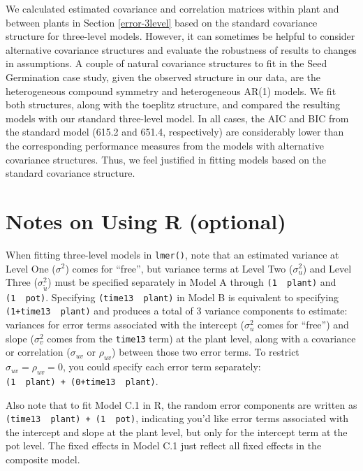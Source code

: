 \documentclass[
]{krantz}
\begin{document}
We calculated estimated covariance and correlation matrices within plant and between plants in Section \ref{error-3level} based on the standard covariance structure for three-level models. However, it can sometimes be helpful to consider alternative covariance structures and evaluate the robustness of results to changes in assumptions. A couple of natural covariance structures to fit in the Seed Germination case study, given the observed structure in our data, are the heterogeneous compound symmetry and heterogeneous AR(1) models. We fit both structures, along with the toeplitz structure, and compared the resulting models with our standard three-level model. In all cases, the AIC and BIC from the standard model (615.2 and 651.4, respectively) are considerably lower than the corresponding performance measures from the models with alternative covariance structures. Thus, we feel justified in fitting models based on the standard covariance structure.

\hypertarget{usingR3}{%
\section{Notes on Using R (optional)}\label{usingR3}}

When fitting three-level models in \texttt{lmer()}, note that an estimated variance at Level One (\(\sigma^{2}\)) comes for ``free'', but variance terms at Level Two (\(\sigma_{u}^{2}\)) and Level Three (\(\sigma_{\tilde{u}}^{2}\)) must be specified separately in Model A through \texttt{(1\ \textbar{}\ plant)} and \texttt{(1\ \textbar{}\ pot)}. Specifying \texttt{(time13\ \textbar{}\ plant)} in Model B is equivalent to specifying \texttt{(1+time13\ \textbar{}\ plant)} and produces a total of 3 variance components to estimate: variances for error terms associated with the intercept (\(\sigma_{u}^{2}\) comes for ``free'') and slope (\(\sigma_{v}^{2}\) comes from the \texttt{time13} term) at the plant level, along with a covariance or correlation (\(\sigma_{uv}\) or \(\rho_{uv}\)) between those two error terms. To restrict \(\sigma_{uv} = \rho_{uv} = 0\), you could specify each error term separately: \texttt{(1\ \textbar{}\ plant)\ +\ (0+time13\ \textbar{}\ plant)}.

Also note that to fit Model C.1 in R, the random error components are written as \texttt{(time13\ \textbar{}\ plant)\ +\ (1\ \textbar{}\ pot)}, indicating you'd like error terms associated with the intercept and slope at the plant level, but only for the intercept term at the pot level. The fixed effects in Model C.1 just reflect all fixed effects in the composite model.
\end{document}
